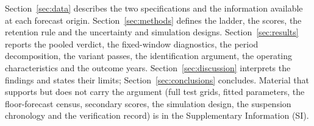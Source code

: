 Section~\ref{sec:data} describes the two specifications and the information available at each forecast origin. Section~\ref{sec:methods} defines the ladder, the scores, the retention rule and the uncertainty and simulation designs. Section~\ref{sec:results} reports the pooled verdict, the fixed-window diagnostics, the period decomposition, the variant passes, the identification argument, the operating characteristics and the outcome years. Section~\ref{sec:discussion} interprets the findings and states their limits; Section~\ref{sec:conclusions} concludes. Material that supports but does not carry the argument (full test grids, fitted parameters, the floor-forecast census, secondary scores, the simulation design, the suspension chronology and the verification record) is in the Supplementary Information (SI).
